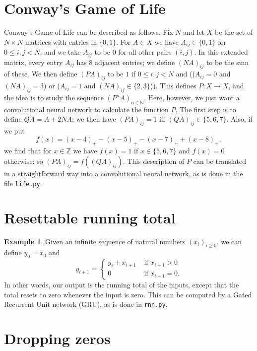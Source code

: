 \documentclass{amsart}
\newcommand{\N}         {{\mathbb{N}}}
\newcommand{\Z}         {{\mathbb{Z}}}
\newcommand{\tm}        {\times}
\renewcommand{\:}{\colon}
\theoremstyle{definition}
\newtheorem{example}[theorem]{Example}
\begin{document}
\section{Conway's Game of Life}

Conway's Game of Life can be described as follows.  Fix $N$ and let
$X$ be the set of $N\tm N$ matrices with entries in $\{0,1\}$.  For
$A\in X$ we have $A_{ij}\in\{0,1\}$ for $0\leq i,j<N$, and we take
$A_{ij}$ to be $0$ for all other pairs $(i,j)$.  In this extended
matrix, every entry $A_{ij}$ has $8$ adjacent entries; we define
$(NA)_{ij}$ to be the sum of these.  We then define $(PA)_{ij}$ to be
$1$ if $0\leq i,j<N$ and (($A_{ij}=0$ and $(NA)_{ij}=3$) or  
($A_{ij}=1$ and $(NA)_{ij}\in\{2,3\}$)).  This defines $P\:X\to X$,
and the idea is to study the sequence $(P^nA)_{n\in\N}$.  Here,
however, we just want a convolutional neural network to calculate the
function $P$.  The first step is to define $QA=A+2NA$; we then have
$(PA)_{ij}=1$ iff $(QA)_{ij}\in\{5,6,7\}$.  Also, if we put 
\[ f(x)=(x-4)_+ - (x-5)_+ - (x-7)_+ + (x-8)_+,\]
we find that for $x\in\Z$ we have $f(x)=1$ if $x\in\{5,6,7\}$ and
$f(x)=0$ otherwise; so $(PA)_{ij}=f((QA)_{ij})$.  This description of
$P$ can be translated in a straightforward way into a convolutional
neural network, as is done in the file \texttt{life.py}.

\section{Resettable running total}

\begin{example}\label{eg-running}
 Given an infinite sequence of natural numbers $(x_i)_{i\geq 0}$, we
 can define $y_0=x_0$ and 
 \[ y_{i+1} = \begin{cases}
     y_i+x_{i+1} & \text{ if } x_{i+1} > 0 \\
     0 & \text{ if } x_{i+1} = 0.
    \end{cases}
 \]
 In other words, our output is the running total of the inputs, except
 that the total resets to zero whenever the input is zero.  This can
 be computed by a Gated Recurrent Unit network (GRU), as is done in
 \texttt{rnn.py}. 
\end{example}

\section{Dropping zeros}
\end{document}
